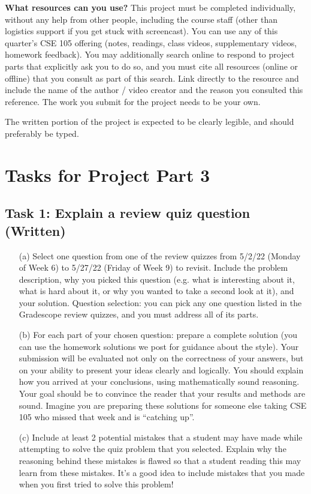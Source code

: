  {\bf What resources can you use? }
 This project must be completed individually, without any help from other people, 
 including the course staff (other than logistics support if you get stuck with screencast). 
 You can use any of this quarter’s CSE 105 offering (notes, readings, class videos, 
 supplementary videos, homework feedback). You may additionally search online to respond to 
 project parts that explicitly ask you to do so, and you must  cite all resources (online or offline) 
 that you consult as part of this search. Link directly to the resource and include the name of the 
 author / video creator and the reason you consulted this reference. The work you submit for the 
 project needs to be your own. 
 
The written portion of the project is expected to be clearly legible, and should preferably be typed.

 \newpage
 \section*{Tasks for Project Part 3}

 \subsection*{Task 1: Explain a review quiz question (Written)}
	
	\begin{enumerate}
		\item[(a)] Select one question from one of the review quizzes from 5/2/22 (Monday of Week 6) to 5/27/22  (Friday of Week 9) to revisit.
		Include the problem description, why you picked this question (e.g. what is interesting about it, what is hard about it, 
		or why you wanted to take a second look at it), and your solution. Question selection: 
		you can pick any one question listed in the Gradescope review quizzes, and you must address 
		all  of its parts. 
 		\item[(b)] For each part of your chosen question: prepare a complete solution 
		 (you can use the homework solutions we post for guidance about the style). 
		 Your submission will be evaluated not only on the correctness of your answers, 
		 but on your ability to present your ideas clearly and logically. You should explain how you arrived at your conclusions, 
		 using mathematically sound reasoning. Your goal should be to convince the reader that your results and 
		 methods are sound. Imagine you are preparing these solutions for someone else taking 
		 CSE 105 who missed that week and is “catching up”.
 
 		\item[(c)] Include at least 2 potential mistakes that a student may have made while attempting to solve the quiz 
		 problem that you selected. Explain why the reasoning behind these mistakes is flawed so that 
		 a student reading this may learn from these mistakes. It's a good idea to include mistakes that you made 
		 when you first tried to solve this problem!	
	\end{enumerate}
	
